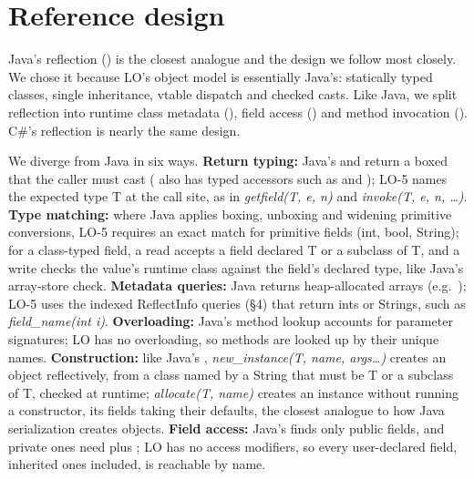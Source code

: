 \section{Reference design}
Java's reflection () is the closest analogue and the
design we follow most closely. We chose it because LO's object model is
essentially Java's: statically typed classes, single inheritance, vtable
dispatch and checked casts. Like Java, we split reflection into runtime class
metadata (), field access () and method invocation
(). C\#'s reflection is nearly the same design.

We diverge from Java in six ways. \textbf{Return typing:} Java's
 and  return a boxed
 that the caller must cast ( also has typed
accessors such as  and ); LO-5 names the
expected type T at the call site, as in \textit{getfield(T, e, n)} and
\textit{invoke(T, e, n, \ldots)}. \textbf{Type matching:} where Java applies
boxing, unboxing and widening primitive conversions, LO-5 requires an exact
match for primitive fields (int, bool, String); for a class-typed field, a
read accepts a field declared T or a subclass of T, and a write checks the
value's runtime class against the field's declared type, like Java's
array-store check. \textbf{Metadata queries:} Java returns heap-allocated
arrays (e.g.\ ); LO-5 uses the indexed ReflectInfo
queries (\S4) that return ints or Strings, such as \textit{field\_name(int i)}. \textbf{Overloading:}
Java's method lookup accounts for parameter signatures; LO has no
overloading, so methods are looked up by their unique names.
\textbf{Construction:} like Java's ,
\textit{new\_instance(T, name, args\ldots)} creates an object reflectively,
from a class named by a String that must be T or a subclass of T, checked at
runtime; \textit{allocate(T, name)} creates an instance without running a
constructor, its fields taking their defaults, the closest analogue to how
Java serialization creates objects. \textbf{Field access:} Java's
 finds only public fields, and private ones need
 plus ; LO has no access
modifiers, so every user-declared field, inherited ones included, is
reachable by name.
